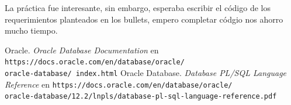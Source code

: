 \documentclass{article}
\begin{document}
La práctica fue interesante, sin embargo, esperaba escribir el código de los
requerimientos planteados en los bullets, empero completar códgio nos ahorro
mucho tiempo.

\renewcommand\refname{Bibliografía}
\begin{thebibliography}{99}
     Oracle. \textit{Oracle Database Documentation} en 
        \texttt{https://docs.oracle.com/en/database/oracle/\\oracle-database/%
        index.html}
     Oracle Database. \textit{Database PL/SQL Language 
        Reference} en 
        \texttt{https://docs.oracle.com/en/database/oracle/\\
        oracle-database/12.2/lnpls/database-pl-sql-language-reference.pdf}
\end{thebibliography}
\end{document}
